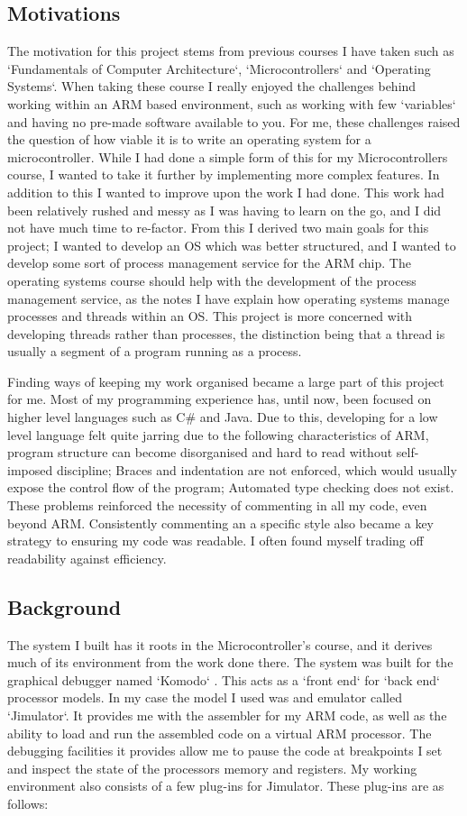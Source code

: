 \label{motivations}
\subsection{Motivations}
The motivation for this project stems from previous courses I have taken such as `Fundamentals of Computer Architecture`, `Microcontrollers` and `Operating Systems`. When taking these course I really enjoyed the challenges behind working within an ARM based environment, such as working with few `variables` and having no pre-made software available to you. For me, these challenges raised the question of how viable it is to write an operating system for a microcontroller.
While I had done a simple form of this for my Microcontrollers course, I wanted to take it further by implementing more complex features. In addition to this I wanted to improve upon the work I had done. This work had been relatively rushed and messy as I was having to learn on the go, and I did not have much time to re-factor. From this I derived two main goals for this project; I wanted to develop an OS which was better structured, and I wanted to develop some sort of process management service for the ARM chip. The operating systems course should help with the development of the process management service, as the notes I have explain how operating systems manage processes and threads within an OS. This project is more concerned with developing threads rather than processes, the distinction being that a thread is usually a segment of a program running as a process. 

Finding ways of keeping my work organised became a large part of this project for me. Most of my programming experience has, until now, been focused on higher level languages such as C\# and Java. Due to this, developing for a low level language felt quite jarring due to the following characteristics of ARM, program structure can become disorganised and hard to read without self-imposed discipline; Braces and indentation are not enforced, which would usually expose the control flow of the program; Automated type checking does not exist. These problems reinforced the necessity of commenting in all my code, even beyond ARM. Consistently commenting an a specific style also became a key strategy to ensuring my code was readable. I often found myself trading off readability against efficiency.

\subsection{Background}
The system I built has it roots in the Microcontroller's course, and it derives much of its environment from the work done there. The system was built for the graphical debugger named `Komodo` \cite{kmd}. This acts as a `front end` for `back end` processor models. In my case the model I used was  and emulator called `Jimulator`. It provides me with the assembler for my ARM code, as well as the ability to load and run the assembled code on a virtual ARM processor. The debugging facilities it provides allow me to pause the code at breakpoints I set and inspect the state of the processors memory and registers. My working environment also consists of a few plug-ins for Jimulator. These plug-ins are as follows:

